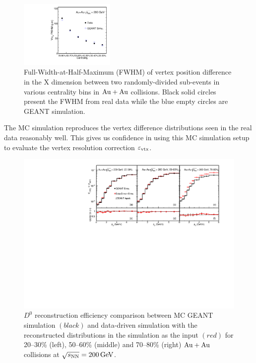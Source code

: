 \documentclass[%
 reprint,	
 amsmath,amssymb,
 aps,
 prc,
]{revtex4-1}
\begin{document}
\begin{figure}
\centering
\includegraphics[width=0.41\textwidth]{fig/vtxX_vsCent.pdf}
\caption{Full-Width-at-Half-Maximum (FWHM) of vertex position difference in the X dimension between two randomly-divided sub-events in various centrality bins in ${\rm{Au + Au}}$ collisions. Black solid circles present the FWHM from real data while the blue empty circles are GEANT simulation.}
\label{fig:vtxX_vsCent} 
\end{figure}

The MC simulation reproduces the vertex difference distributions seen in the real data reasonably well. This gives us confidence in using this MC simulation setup to evaluate the vertex resolution correction $\varepsilon_{\rm vtx}$.

\begin{figure}
\centering
\includegraphics[width=1.05\textwidth]{fig/Mcd0Eff_20_80.pdf}
\caption{$D^{0}$ reconstruction efficiency comparison between MC GEANT simulation $(black)$ and  data-driven simulation with the reconstructed distributions in the simulation as the input $(red)$ for 20--30\% (left), 50--60\% (middle) and 70--80\% (right) ${\rm{Au + Au}}$ collisions at ${\sqrt{s_{\rm NN}} = \rm{200\,GeV}}$.}
\label{fig:Mcd0Eff_20_80} 
\end{figure}
\end{document}
